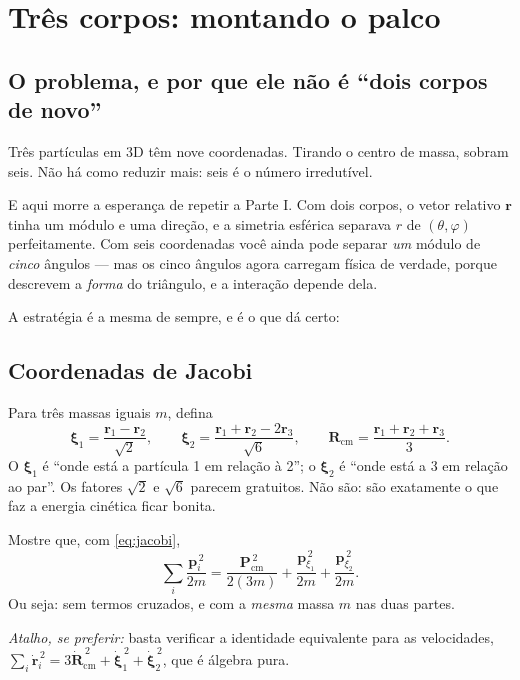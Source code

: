 \documentclass[11pt,a4paper]{article}
\renewcommand{\vec}[1]{\mathbf{#1}}
\newcommand{\bxi}{\vec{\xi}}
\begin{document}
\section{Três corpos: montando o palco}
\label{sec:tres}

\subsection{O problema, e por que ele não é ``dois corpos de novo''}

Três partículas em 3D têm nove coordenadas. Tirando o centro de massa, sobram seis.
Não há como reduzir mais: seis é o número irredutível.

E aqui morre a esperança de repetir a Parte I. Com dois corpos, o vetor relativo
$\vec r$ tinha um módulo e uma direção, e a simetria esférica separava
$r$ de $(\theta,\varphi)$ perfeitamente. Com seis coordenadas você ainda pode separar
\emph{um} módulo de \emph{cinco} ângulos --- mas os cinco ângulos agora carregam
física de verdade, porque descrevem a \emph{forma} do triângulo, e a interação
depende dela.

A estratégia é a mesma de sempre, e é o que dá certo:
\begin{center}
\end{center}

\subsection{Coordenadas de Jacobi}

Para três massas iguais $m$, defina
\begin{equation}
\bxi_{1} = \frac{\vec r_{1}-\vec r_{2}}{\sqrt{2}},
\qquad
\bxi_{2} = \frac{\vec r_{1}+\vec r_{2}-2\vec r_{3}}{\sqrt{6}},
\qquad
\vec R_{\text{cm}} = \frac{\vec r_{1}+\vec r_{2}+\vec r_{3}}{3}.
\label{eq:jacobi}
\end{equation}
O $\bxi_{1}$ é ``onde está a partícula 1 em relação à 2''; o $\bxi_{2}$ é ``onde está
a 3 em relação ao par''. Os fatores $\sqrt2$ e $\sqrt6$ parecem gratuitos. Não são:
são exatamente o que faz a energia cinética ficar bonita.

\begin{suavez}
Mostre que, com \eqref{eq:jacobi},
\[
\sum_{i} \frac{\vec p_{i}^{\,2}}{2m}
= \frac{\vec P_{\text{cm}}^{\,2}}{2(3m)}
+ \frac{\vec p_{\xi_{1}}^{\,2}}{2m} + \frac{\vec p_{\xi_{2}}^{\,2}}{2m}.
\]
Ou seja: sem termos cruzados, e com a \emph{mesma} massa $m$ nas duas partes.

\emph{Atalho, se preferir:} basta verificar a identidade equivalente para as
velocidades, $\sum_i \dot{\vec r}_i^{\,2} = 3\dot{\vec R}_{\text{cm}}^{\,2}
+ \dot{\bxi}_{1}^{\,2} + \dot{\bxi}_{2}^{\,2}$, que é álgebra pura.

\vspace{2.4cm}
\hrulefill
\end{suavez}
\end{document}
